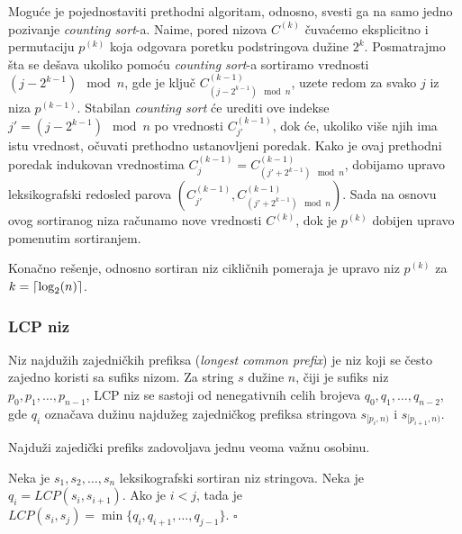 Mogu\' ce je pojednostaviti prethodni algoritam, odnosno, svesti ga na samo jedno pozivanje \textit{counting sort}-a. Naime, pored nizova $C^{(k)}$ \v cuva\' cemo eksplicitno i permutaciju $p^{(k)}$ koja odgovara poretku podstringova du\v zine $2^k$. Posmatrajmo \v sta se de\v sava ukoliko pomo\' cu \textit{counting sort}-a sortiramo vrednosti $(j - 2^{k-1}) \mod n$, gde je klju\v c $C^{(k-1)}_{(j - 2^{k-1}) \mod n}$, uzete redom za svako $j$ iz niza $p^{(k-1)}$. Stabilan \textit{counting sort} \' ce urediti ove indekse $j' = (j - 2^{k-1}) \mod n$ po vrednosti $C^{(k-1)}_{j'}$, dok \' ce, ukoliko vi\v se njih ima istu vrednost, o\v cuvati prethodno ustanovljeni poredak. Kako je ovaj prethodni poredak indukovan vrednostima $C^{(k-1)}_j = C^{(k-1)}_{(j' + 2^{k-1}) \mod n}$, dobijamo upravo leksikografski redosled parova $(C^{(k-1)}_{j'}, C^{(k-1)}_{(j' + 2^{k-1}) \mod n})$. Sada na osnovu ovog sortiranog niza ra\v cunamo nove vrednosti $C^{(k)}$, dok je $p^{(k)}$ dobijen upravo pomenutim sortiranjem.

Kona\v cno re\v senje, odnosno sortiran niz cikli\v cnih pomeraja je upravo niz $p^{(k)}$ za $k = \left \lceil \log_2(n) \right \rceil$.

\noindent
\begin{minipage}[l]{\textwidth}

\end{minipage}

\subsubsection{LCP niz}

Niz najdu\v zih zajedni\v ckih prefiksa (\textit{longest common prefix}) je niz koji se \v cesto zajedno koristi sa sufiks nizom. Za string $s$ du\v zine $n$, \v ciji je sufiks niz $p_0, p_1, \ldots, p_{n-1}$, LCP niz se sastoji od nenegativnih celih brojeva $q_0, q_1, \ldots, q_{n-2}$, gde $q_i$ ozna\v cava du\v zinu najdu\v zeg zajedni\v ckog prefiksa stringova $s_{[p_i, n)}$ i $s_{[p_{i+1}, n)}$.

Najdu\v zi zajedi\v cki prefiks zadovoljava jednu veoma va\v znu osobinu.

\begin{thm}
\label{lcposobina}
Neka je $s_1, s_2, \ldots, s_n$ leksikografski sortiran niz stringova. Neka je $q_i = LCP(s_i, s_{i+1})$. Ako je $i<j$, tada je $LCP(s_i, s_j) = \min\{q_i, q_{i+1}, \ldots, q_{j-1}\}$. \hfill $\square$
\end{thm}

